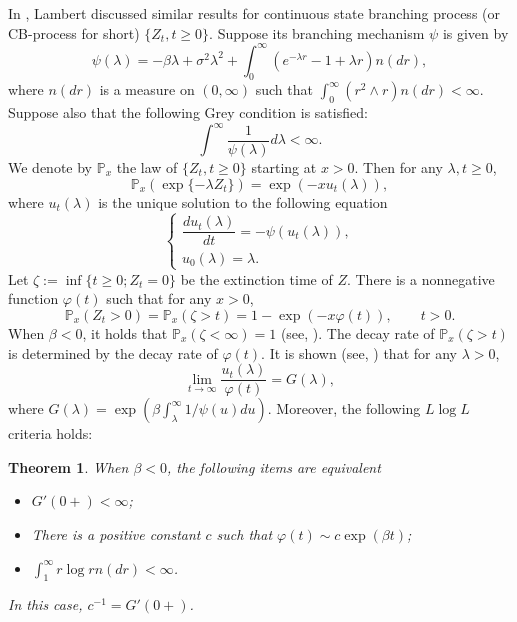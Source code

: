 \documentclass[12pt,a4paper]{amsart}
\numberwithin{equation}{section}
\theoremstyle{plain}
\newtheorem{thm}{Theorem}[section]
\theoremstyle{definition}
\theoremstyle{remark}
\begin{document}
In \cite{Lambert2001Arbres,Lambert2003Coalescence}, Lambert discussed  similar results for continuous  state  branching process (or CB-process for short) $\{Z_t, t\geq 0\}$. Suppose its branching mechanism $\psi$ is given by 
\[
\psi(\lambda)=-\beta\lambda+\sigma^2\lambda^2+\int_0^\infty \left(e^{-\lambda r}-1+\lambda r\right)n(dr),
\]
where $n(dr)$ is a measure on $(0,\infty)$ such that $\int_0^\infty (r^2\wedge r) n(dr)<\infty$. Suppose also that the following Grey condition is satisfied:
\begin{equation}\label{extinc assump  for continuous}
\int^\infty\dfrac{1}{\psi(\lambda)}d\lambda<\infty.
\end{equation}
We denote by $\mathbb P_x$ the law of $\{Z_t,t\geq 0\}$ starting at $x>0$. Then for any $\lambda, t\geq 0$,
\[
\mathbb P_x\left(\exp\{-\lambda Z_t\}\right)=\exp(-xu_t(\lambda)),
\]
where $u_t(\lambda)$ is the unique solution to the following equation
\begin{equation}
\begin{cases}
\dfrac{d u_t(\lambda)}{dt}=-\psi(u_t(\lambda)),\\
u_0(\lambda)=\lambda.
\end{cases}
\end{equation}
Let $\zeta:=\inf\{t\geq 0; Z_t=0\}$ be the extinction time of $Z$.  There is
a nonnegative function $\varphi(t)$ such that for any $x>0$,
\[
\mathbb P_x(Z_t>0)=\mathbb P_x(\zeta>t)=1-\exp(-x\varphi(t)), \qquad t>0.
\]
When $\beta<0$, it holds that
 $
 \mathbb P_x(\zeta<\infty)=1
 $ (see, \cite{Grey1974Asymptotic}).
   The decay rate of $\mathbb P_x(\zeta>t)$ is determined by the decay rate of $\varphi(t)$.  It is shown (see, \cite{Lambert2007Quasi-stationary}) that for any $\lambda>0$,
\[
\lim_{t\rightarrow\infty}\dfrac{u_t(\lambda)}{\varphi(t)}=G(\lambda),
\]
where $G(\lambda)=\exp(\beta\int_{\lambda}^\infty1/\psi(u)du)$. Moreover, the following $L\log L$ criteria holds:

\begin{thm}\label{equivalent for cbp}
When $\beta<0$, the following items are equivalent
\begin{itemize}
\item[$(i).$] $G'(0+)<\infty$;
\item[$(ii).$] There is a positive constant $c$ such that $\varphi(t)\sim c\exp(\beta t)$;
\item[$(iii).$] $\int_1^\infty r\log r n(dr)<\infty$.
\end{itemize}
In this case, $c^{-1}=G'(0+)$.
 \end{thm}
\end{document}

